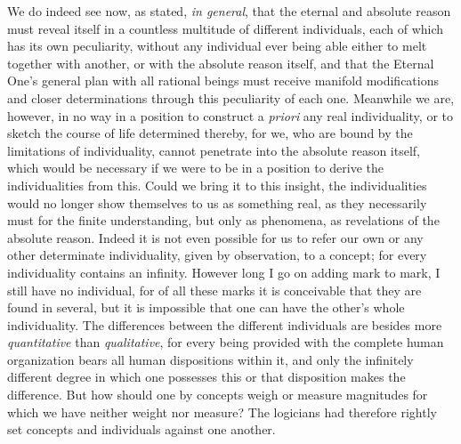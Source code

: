 \documentclass[12pt,a4paper,openany]{book}
\newcommand{\opage}[1]{\marginnote{\footnotesize\textit{[#1]}}}
\begin{document}
We do indeed see now, as stated, \emph{in general}, that the eternal and absolute
reason must reveal itself in a countless multitude of different individuals, each of
which has its own peculiarity, without any individual ever being able either to melt
together with another, or with the absolute reason itself, and that the Eternal
One's general plan with all rational beings must receive manifold modifications and
closer determinations through this peculiarity of each one. Meanwhile we are,
however, in no way in a position to construct a \textit{priori} any real
individuality, or to sketch the course of life determined thereby, for we, who are
bound by the limitations of individuality, cannot penetrate into the absolute reason
itself, which would be necessary if we were to be in a position to derive the
individualities from this. Could we bring it to this insight, the individualities
would no longer show themselves to us as something real, as they necessarily must
for the finite understanding, but only as phenomena, as revelations of the absolute
reason. Indeed it is not even possible for us to refer our own or any other
determinate individuality, given by observation, to a concept; for every
individuality contains an
\setcounter{footnote}{0}%
\opage{89}infinity. However long I go on adding mark to mark, I still have no individual,
for of all these marks it is conceivable that they are found in several, but it is
impossible that one can have the other's whole individuality. The differences
between the different individuals are besides more \emph{quantitative} than
\emph{qualitative}, for every being provided with the complete human organization
bears all human dispositions within it, and only the infinitely different degree in
which one possesses this or that disposition makes the difference. But how should
one by concepts weigh or measure magnitudes for which we have neither weight nor
measure? The logicians had therefore rightly set concepts and individuals against
one another.
\end{document}
